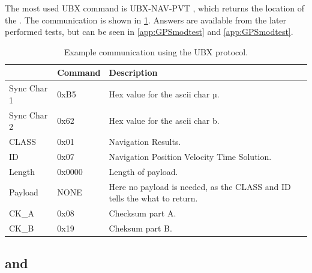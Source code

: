 The most used UBX command is UBX-NAV-PVT \cite[p.~160]{NEO7_proto}, which returns the location of the \GPS.
The communication is shown in \cref{tab:UBXex}.
Answers are available from the later performed tests, but can be seen in \cref{app:GPSmodtest} and \cref{app:GPSmodtest}.

\begin{table}
	\centering
	\begin{tabularx}{\textwidth}{l l X}
		\toprule
		& \textbf{Command} & \textbf{Description} \\
		\midrule
		Sync Char 1 & 0xB5 & Hex value for the ascii char µ. \\
		Sync Char 2 & 0x62 & Hex value for the ascii char b. \\
		CLASS & 0x01 & Navigation Results. \\
		ID & 0x07 &  Navigation Position Velocity Time Solution. \\
		Length & 0x0000 & Length of payload. \\
		Payload & NONE & Here no payload is needed, as the CLASS and ID tells the \GPS what to return. \\
		CK\_A & 0x08 & Checksum part A. \\
		CK\_B & 0x19 & Cheksum part B. \\
		\bottomrule
	\end{tabularx}
	\caption{Example communication using the UBX protocol.}
	\label{tab:UBXex}
\end{table}

\subsection{\SAMD and \SARA}



\FloatBarrier